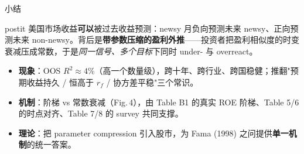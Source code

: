 \documentclass[aspectratio=169,10pt]{beamer}
\begin{document}
\begin{frame}{小结}
	\begin{beamercolorbox}[sep=0.6em,wd=\linewidth,rounded=true]{postit}
		美国市场收益\textbf{可以}被过去收益预测：newsy 月负向预测未来 newsy、正向预测未来 non-newsy。背后是\textbf{带参数压缩的盈利外推}——投资者把盈利相似度的时变衰减压成常数，于是\emph{同一信号、多个目标}下同时 under- 与 overreact。
	\end{beamercolorbox}
	\vspace{6pt}
	\begin{itemize}
		\item \textbf{现象}：OOS $R^2\approx4\%$（高一个数量级），跨十年、跨行业、跨国稳健；推翻"预期收益持久 / 恒高于 $r_f$ / 协方差平稳"三个常识。
		\item \textbf{机制}：阶梯 vs 常数衰减（Fig.\,4），由 Table B1 的真实 ROE 阶梯、Table 5/6 的时点对齐、Table 7/8 的 survey 共同支撑。
		\item \textbf{理论}：把 parameter compression 引入股市，为 Fama (1998) 之问提供\textbf{单一机制}的统一答案。
	\end{itemize}
\end{frame}
\end{document}
